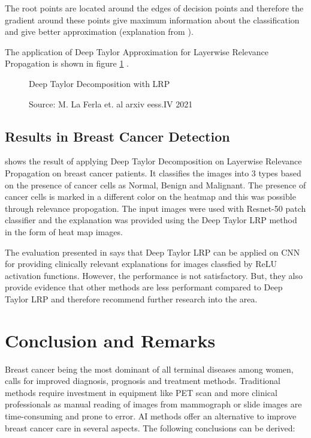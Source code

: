 \documentclass[sigconf, language=english]{acmart}
\begin{document}
The root points are located around the edges of decision points and therefore the gradient around these points give maximum information about the classification and give better approximation (explanation from \cite{schiebler17}).

The application of Deep Taylor Approximation for Layerwise Relevance Propagation is shown in figure \ref{dtlrptech} .

\begin{figure} [ht]
  \centering
    \caption{Deep Taylor Decomposition with LRP}
    \caption*{Source: M. La Ferla et. al arxiv eess.IV 2021}
  \label{dtlrptech}
\end{figure}

\clearpage
\subsection{Results in Breast Cancer Detection}

\cite{insitu2021} shows the result of applying Deep Taylor Decomposition on Layerwise Relevance Propagation on breast cancer patients. It classifies the images into 3 types based on the presence of cancer cells as Normal, Benign and Malignant. The presence of cancer cells is marked in a different color on the heatmap and this was possible through relevance propogation. 
The input images were used with Resnet-50 patch classifier and the explanation was provided using the Deep Taylor LRP method in the form of heat map images. 

The evaluation presented in \cite{insitu2021} says that Deep Taylor LRP can be applied on CNN for providing clinically relevant explanations for images classfied by ReLU activation functions. However, the performance is not satisfactory. But, they also provide evidence that other methods are less performant compared to Deep Taylor LRP and therefore recommend further research into the area.


\section{Conclusion and Remarks}

Breast cancer being the most dominant of all terminal diseases among women, calls for improved diagnosis, prognosis and treatment methods. Traditional methods require investment in equipment like PET scan and more clinical professionals as manual reading of images from mammograph or slide images are time-consuming and prone to error. AI methods offer an alternative to improve breast cancer care in several aspects. The following conclusions can be derived: 
\end{document}

